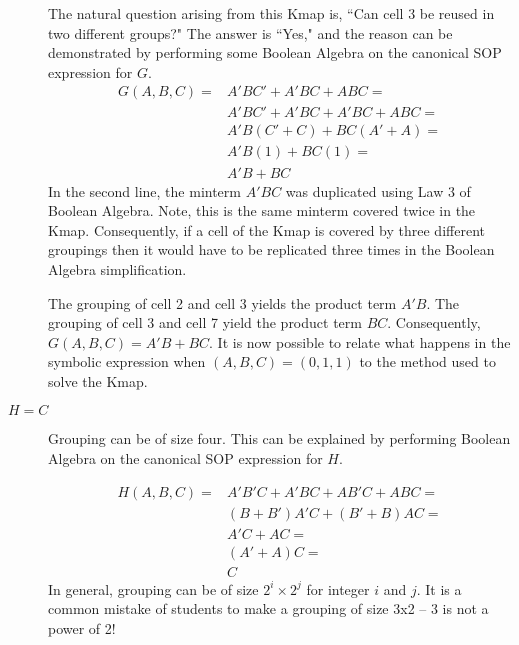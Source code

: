 \begin{changemargin}{1.5cm}{1.5cm}
\begin{description}

    The natural question arising from this Kmap is, ``Can
    cell 3 be reused in two different groups?"  The answer is ``Yes," and the reason
    can be demonstrated by performing some Boolean Algebra on the canonical
    SOP expression for $G$.
    $$
    \begin{array}{ll}
        G(A,B,C) =    & A'BC' + A'BC + ABC = \\
        & A'BC' + A'BC + A'BC + ABC = \\
        & A'B(C' + C) + BC(A'+A) = \\
        & A'B(1) + BC(1) = \\
        & A'B + BC
    \end{array}$$
    In the second line, the minterm $A'BC$ was duplicated using Law 3 of Boolean
    Algebra.  Note, this is the same minterm covered twice in the
    Kmap.  Consequently, if a cell of the Kmap is covered by three different
    groupings then it would have to be replicated three times in the Boolean
    Algebra simplification.

    The grouping of cell 2 and cell 3 yields the product term $A'B$.  The
    grouping of cell 3 and cell 7 yield the product term $BC$.
    Consequently, $G(A,B,C) = A'B + BC$.  It is now possible to relate what
    happens in the symbolic expression when $(A,B,C) = (0,1,1)$ to the method
    used to solve the Kmap.

\item [$H=C$]
    Grouping can be of size four.  This can be explained by performing Boolean
    Algebra on the canonical SOP expression for $H$.

    $$
    \begin{array}{ll}
        H(A,B,C) =     & A'B'C + A'BC + AB'C + ABC = \\
        & (B+B')A'C + (B'+B)AC =  \\
        & A'C + AC = \\
        & (A'+A)C = \\
        & C
    \end{array}$$
    In general, grouping can be of size $2^i \times 2^j$ for integer $i$ and $j$.
    It is a common mistake of students to make a grouping of size 3x2 --  3 is not
    a power of 2!


\end{description}
\end{changemargin}
